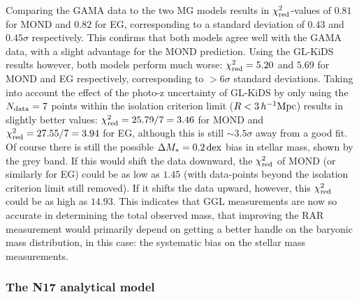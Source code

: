 \documentclass[usenatbib]{mnras}
\newcommand{\hMpc}{\, h^{-1}{\rm{Mpc}} }
\newcommand{\un}[1]{_{\rm #1}}
\newcommand{\dex}{\, {\rm dex}}
\begin{document}
Comparing the GAMA data to the two MG models results in $\chi\un{red}^2$-values of $0.81$ for MOND and $0.82$ for EG, corresponding to a standard deviation of $0.43$ and $0.45 \sigma$ respectively. This confirms that both models agree well with the GAMA data, with a slight advantage for the MOND prediction. Using the GL-KiDS results however, both models perform much worse: $\chi\un{red}^2=5.20$ and $5.69$ for MOND and EG respectively, corresponding to $>6 \sigma$ standard deviations. Taking into account the effect of the photo-z uncertainty of GL-KiDS by only using the $N\un{data}=7$ points within the isolation criterion limit ($R < 3 \hMpc$) results in slightly better values: $\chi\un{red}^2 = 25.79/7 = 3.46$ for MOND and $\chi\un{red}^2 = 27.55/7 = 3.94$ for EG, although this is still $\sim3.5 \sigma$ away from a good fit. Of course there is still the possible $\Delta M_* = 0.2 \dex$ bias in stellar mass, shown by the grey band. If this would shift the data downward, the $\chi\un{red}^2$ of MOND (or similarly for EG) could be as low as $1.45$ (with data-points beyond the isolation criterion limit still removed). If it shifts the data upward, however, this $\chi\un{red}^2$ could be as high as $14.93$. This indicates that GGL measurements are now so accurate in determining the total observed mass, that improving the RAR measurement would primarily depend on getting a better handle on the baryonic mass distribution, in this case: the systematic bias on the stellar mass measurements.

\subsubsection{The N17 analytical model}
\end{document}
